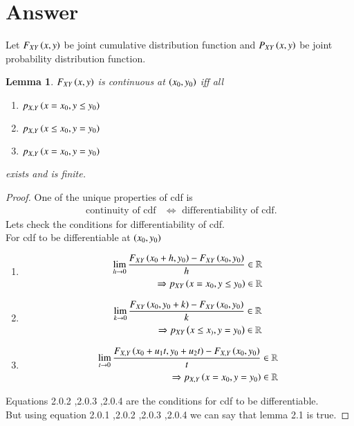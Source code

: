 \documentclass[journal,12pt,twocolumn]{IEEEtran}
\newtheorem{lemma}[theorem]{Lemma}
\begin{document}
\section{Answer}
Let $F_{XY}\left(x,y\right)$ be joint cumulative distribution function and $P_{XY}\left(x,y\right)$ be joint probability distribution function.\\
\begin{lemma}
$F_{XY}\left(x,y\right)$ is continuous at $\left(x_0,y_0\right)$ iff all
\begin{enumerate}
\item $p_{X,Y}\left(x=x_0,y \leq y_0\right)$
\item $p_{X,Y}\left(x \leq x_0,y = y_0\right)$
\item $p_{X,Y}\left(x=x_0,y = y_0\right)$
\end{enumerate}
exists and is finite.
\end{lemma}
\begin{proof}
One of the unique properties of cdf is 
\begin{align}
\text{ continuity of cdf} &\Leftrightarrow \text{ differentiability of cdf}.
\end{align}
Lets check the conditions for differentiability of cdf.\\
For cdf to be differentiable at $\left(x_0,y_0\right)$
\begin{enumerate}
\item 
\begin{align}
\lim_{h \rightarrow 0} \frac{F_{XY}\left(x_0+h,y_0\right)-F_{XY}\left(x_0,y_0\right)}{h} & \in \mathbb{R}\nonumber \\
\Rightarrow p_{XY}\left(x=x_0,y \leq y_0\right) & \in \mathbb{R}
\end{align}
\item 
\begin{align}
\lim_{k \rightarrow 0} \frac{F_{XY}\left(x_0,y_0+k\right)-F_{XY}\left(x_0,y_0\right)}{k} &\in \mathbb{R} \nonumber \\
\Rightarrow p_{XY}\left(x \leq x_),y=y_0\right) & \in \mathbb{R} 
\end{align}
\item 
\begin{align}
\lim_{t \rightarrow 0} \frac{F_{X,Y}\left(x_0+u_1 t,y_0 + u_2 t\right)-F_{X,Y}\left(x_0,y_0\right)}{t} &\in \mathbb{R} \nonumber \\
\Rightarrow p_{X,Y}\left(x=x_0,y=y_0\right) &\in \mathbb{R}
\end{align}
\end{enumerate}
Equations 2.0.2 ,2.0.3 ,2.0.4 are the conditions for cdf to be differentiable.\\
But using equation 2.0.1 ,2.0.2 ,2.0.3 ,2.0.4 we can say that lemma 2.1 is true.
\end{proof}
\end{document}
